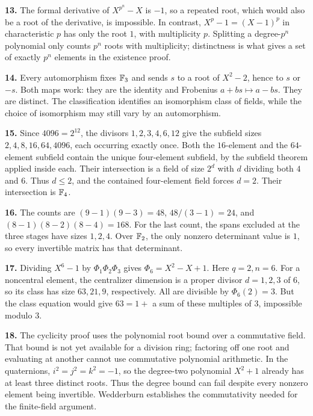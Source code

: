\textbf{13.} The formal derivative of $X^{p^n}-X$ is $-1$, so a
repeated root, which would also be a root of the derivative, is
impossible. In contrast, $X^p-1=(X-1)^p$ in characteristic $p$ has
only the root $1$, with multiplicity $p$. Splitting a degree-$p^n$
polynomial only counts $p^n$ roots with multiplicity; distinctness is
what gives a set of exactly $p^n$ elements in the existence proof.

\textbf{14.} Every automorphism fixes $\mathbb F_3$ and sends $s$ to a
root of $X^2-2$, hence to $s$ or $-s$. Both maps work: they are
the identity and Frobenius $a+bs\mapsto a-bs$. They are distinct.
The classification identifies an isomorphism class of fields, while
the choice of isomorphism may still vary by an automorphism.

\textbf{15.} Since $4096=2^{12}$, the divisors $1,2,3,4,6,12$
give the subfield sizes $2,4,8,16,64,4096$, each occurring exactly
once. Both the $16$-element and the $64$-element subfield contain
the unique four-element subfield, by the subfield theorem applied
inside each. Their intersection is a field of size $2^d$ with $d$
dividing both $4$ and $6$. Thus $d\le2$, and the contained four-element
field forces $d=2$. Their intersection is $\mathbb F_4$.

\textbf{16.} The counts are $(9-1)(9-3)=48$, $48/(3-1)=24$, and
$(8-1)(8-2)(8-4)=168$. For the last count, the spans excluded at the
three stages have sizes $1,2,4$. Over $\mathbb F_2$, the only nonzero
determinant value is $1$, so every invertible matrix has that determinant.

\textbf{17.} Dividing $X^6-1$ by
$\Phi_1\Phi_2\Phi_3$ gives $\Phi_6=X^2-X+1$. Here $q=2,n=6$.
For a noncentral element, the centralizer dimension is a proper divisor
$d=1,2,3$ of $6$, so its class has size $63,21,9$, respectively.
All are divisible by $\Phi_6(2)=3$. But the class equation would give
$63=1+$ a sum of these multiples of $3$, impossible modulo $3$.

\textbf{18.} The cyclicity proof uses the polynomial root bound
over a commutative field. That bound is not yet available for a
division ring; factoring off one root and evaluating at another
cannot use commutative polynomial arithmetic. In the quaternions,
$i^2=j^2=k^2=-1$, so the degree-two polynomial $X^2+1$ already has
at least three distinct roots. Thus the degree bound can fail despite
every nonzero element being invertible. Wedderburn establishes the
commutativity needed for the finite-field argument.

